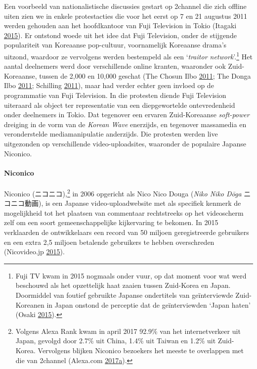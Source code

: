 \documentclass[10.5pt,dutch,]{article}
\let\oldparagraph\paragraph
\renewcommand{\paragraph}[1]{\oldparagraph{#1}\mbox{}}
\begin{document}
Een voorbeeld van nationalistische discussies gestart op 2channel die
zich offline uiten zien we in enkele protestacties die voor het eerst op
7 en 21 augustus 2011 werden gehouden aan het hoofdkantoor van Fuji
Television in Tokio (Itagaki
\protect\hyperlink{ref-itagakiux5fanatomyux5f2015}{2015}). Er ontstond
woede uit het idee dat Fuji Television, onder de stijgende populariteit
van Koreaanse pop-cultuur, voornamelijk Koreaanse drama's uitzond,
waardoor ze vervolgens werden bestempeld als een `\emph{traitor
network}'.\footnote{Fuji TV kwam in 2015 nogmaals onder vuur, op dat
  moment voor wat werd beschouwd als het opzettelijk haat zaaien tussen
  Zuid-Korea en Japan. Doormiddel van foutief gebruikte Japanse
  ondertitels van geïnterviewde Zuid-Koreanen in Japan onstond de
  perceptie dat de geïnterviewden `Japan haten' (Osaki
  \protect\hyperlink{ref-osakiux5ffujiux5f2015}{2015}).} Het aantal
deelnemers werd door verschillende online kranten, waaronder ook
Zuid-Koreaanse, tussen de 2,000 en 10,000 geschat (The Chosun Ilbo
\protect\hyperlink{ref-theux5fchosunux5filboux5fjapaneseux5f2011}{2011};
The Donga Ilbo
\protect\hyperlink{ref-theux5fdongaux5filboux5fjapansux5f2011}{2011};
Schilling \protect\hyperlink{ref-schillingux5fjapaneseux5f2011}{2011}),
maar had verder echter geen invloed op de programmatie van Fuji
Television. In die protesten diende Fuji Television uiteraard als object
ter representatie van een diepgewortelde ontevredenheid onder deelnemers
in Tokio. Dat tegenover een ervaren Zuid-Koreaanse \emph{soft-power}
dreiging in de vorm van de \emph{Korean Wave} enerzijds, en tegenover
massamedia en veronderstelde mediamanipulatie anderzijds. Die protesten
werden live uitgezonden op verschillende video-uploadsites, waaronder de
populaire Japanse Niconico.

\paragraph{Niconico}\label{niconico}

Niconico (ニコニコ),\footnote{Volgens Alexa Rank kwam in april 2017
  92.9\% van het internetverkeer uit Japan, gevolgd door 2.7\% uit
  China, 1.4\% uit Taiwan en 1.2\% uit Zuid-Korea. Vervolgens blijken
  Niconico bezoekers het meeste te overlappen met die van 2channel
  (Alexa.com
  \protect\hyperlink{ref-alexa.comux5fnicovideo.jpux5f2017}{2017}\protect\hyperlink{ref-alexa.comux5fnicovideo.jpux5f2017}{a}).}
in 2006 opgericht als Nico Nico Douga (\emph{Niko Niko Dōga}
ニコニコ動画), is een Japanse video-uploadwebsite met als specifiek
kenmerk de mogelijkheid tot het plaatsen van commentaar rechtstreeks op
het videoscherm zelf om een soort gemeenschappelijke kijkervaring te
bekomen. In 2015 verklaarden de ontwikkelaars een record van 50 miljoen
geregistreerde gebruikers en een extra 2,5 miljoen betalende gebruikers
te hebben overschreden (Nicovideo.jp
\protect\hyperlink{ref-nicovideo.jpux5fpuremiamuux5f2015}{2015}).
\end{document}
